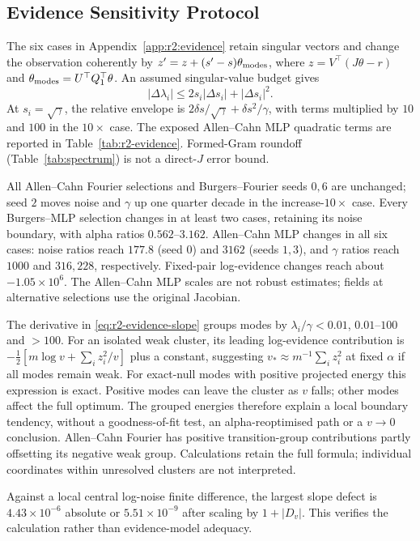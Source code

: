 \subsection{Evidence Sensitivity Protocol}
The six cases in Appendix~\ref{app:r2:evidence} retain singular vectors and change
the observation coherently by $z'=z+(s'-s)\theta_{\rm modes}$, where
$z=V^\top(J\theta-r)$ and $\theta_{\rm modes}=U^\top Q_1^\top\theta$.
An assumed singular-value budget gives
\[
 |\Delta\lambda_i|\le2s_i|\Delta s_i|+|\Delta s_i|^2.
\]
At $s_i=\sqrt\gamma$, the relative envelope is
$2\delta s/\sqrt\gamma+\delta s^2/\gamma$, with terms multiplied by $10$ and
$100$ in the $10\times$ case. The exposed Allen--Cahn MLP quadratic terms are
reported in Table~\ref{tab:r2-evidence}. Formed-Gram roundoff
(Table~\ref{tab:spectrum}) is not a direct-$J$ error bound.

All Allen--Cahn Fourier selections and Burgers--Fourier seeds $0,6$ are unchanged;
seed $2$ moves noise and $\gamma$ up one quarter decade in the increase-$10\times$
case. Every Burgers--MLP selection changes in at least two cases, retaining its
noise boundary, with alpha ratios $0.562$--$3.162$. Allen--Cahn MLP changes in all
six cases: noise ratios reach $177.8$ (seed $0$) and $3162$ (seeds $1,3$), and
$\gamma$ ratios reach $1000$ and $316{,}228$, respectively. Fixed-pair log-evidence
changes reach about $-1.05\times10^6$. The Allen--Cahn MLP scales are not
robust estimates; fields at alternative selections use the original Jacobian.

The derivative in \eqref{eq:r2-evidence-slope} groups modes by
$\lambda_i/\gamma<0.01$, $0.01$--$100$ and $>100$. For an isolated weak cluster,
its leading log-evidence contribution is
$-\tfrac12[m\log v+\sum_i z_i^2/v]$ plus a constant, suggesting
$v_*\approx m^{-1}\sum_i z_i^2$ at fixed $\alpha$ if all modes remain weak.
For exact-null modes with positive projected energy this expression is exact.
Positive modes can leave the cluster as $v$ falls; other modes affect the full
optimum. The grouped energies therefore explain a local boundary tendency,
without a goodness-of-fit test, an alpha-reoptimised path or a $v\to0$ conclusion.
Allen--Cahn Fourier has positive transition-group contributions partly offsetting
its negative weak group. Calculations retain the full formula; individual
coordinates within unresolved clusters are not interpreted.

Against a local central log-noise finite difference, the largest slope defect is
$4.43\times10^{-6}$ absolute or $5.51\times10^{-9}$ after scaling by $1+|D_v|$.
This verifies the calculation rather than evidence-model adequacy.

